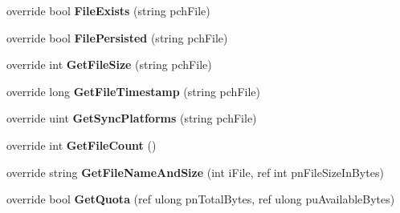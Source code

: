\begin{DoxyCompactItemize}
\item 
\mbox{\label{class_valve_1_1_steamworks_1_1_c_steam_remote_storage_a3971d800d14f6e1b3d1222a8e7941cd3}} 
override bool {\bfseries File\+Exists} (string pch\+File)
\item 
\mbox{\label{class_valve_1_1_steamworks_1_1_c_steam_remote_storage_a1ebec4001709294d6b3c33a2533f66f3}} 
override bool {\bfseries File\+Persisted} (string pch\+File)
\item 
\mbox{\label{class_valve_1_1_steamworks_1_1_c_steam_remote_storage_ace1d06c686b8108eeb6370d8fba825e9}} 
override int {\bfseries Get\+File\+Size} (string pch\+File)
\item 
\mbox{\label{class_valve_1_1_steamworks_1_1_c_steam_remote_storage_a6cd2b3d969ac77872906b2626fee188c}} 
override long {\bfseries Get\+File\+Timestamp} (string pch\+File)
\item 
\mbox{\label{class_valve_1_1_steamworks_1_1_c_steam_remote_storage_a656d30eacafcd305cc27c8b4b16426e5}} 
override uint {\bfseries Get\+Sync\+Platforms} (string pch\+File)
\item 
\mbox{\label{class_valve_1_1_steamworks_1_1_c_steam_remote_storage_a4f017d69fa2f030611e92c625e0e5579}} 
override int {\bfseries Get\+File\+Count} ()
\item 
\mbox{\label{class_valve_1_1_steamworks_1_1_c_steam_remote_storage_a280538817a438d8e736598350f413510}} 
override string {\bfseries Get\+File\+Name\+And\+Size} (int i\+File, ref int pn\+File\+Size\+In\+Bytes)
\item 
\mbox{\label{class_valve_1_1_steamworks_1_1_c_steam_remote_storage_af093f5078d7840b2d3debb36f0e87c71}} 
override bool {\bfseries Get\+Quota} (ref ulong pn\+Total\+Bytes, ref ulong pu\+Available\+Bytes)
\item 

\end{DoxyCompactItemize}

